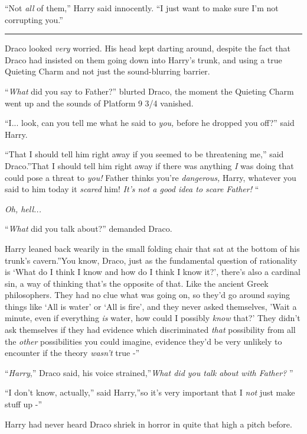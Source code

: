 ``Not \emph{all} of them,'' Harry said innocently. ``I just want to make
sure I'm not corrupting you.''

\begin{center}\rule{3in}{0.4pt}\end{center}

Draco looked \emph{very} worried. His head kept darting around, despite
the fact that Draco had insisted on them going down into Harry's trunk,
and using a true Quieting Charm and not just the sound-blurring barrier.

``\emph{What} did you say to Father?'' blurted Draco, the moment the
Quieting Charm went up and the sounds of Platform 9 3/4 vanished.

``I... look, can you tell me what he said to \emph{you,} before he
dropped you off?'' said Harry.

``That I should tell him right away if you seemed to be threatening
me,'' said Draco.''That I should tell him right away if there was
anything \emph{I} was doing that could pose a threat to \emph{you!}
Father thinks you're \emph{dangerous,} Harry, whatever you said to him
today it \emph{scared} him! \emph{It's not a good idea to scare Father!}
``

\emph{Oh, hell...}

``\emph{What} did you talk about?'' demanded Draco.

Harry leaned back wearily in the small folding chair that sat at the
bottom of his trunk's cavern.''You know, Draco, just as the fundamental
question of rationality is `What do I think I know and how do I think I
know it?', there's also a cardinal sin, a way of thinking that's the
opposite of that. Like the ancient Greek philosophers. They had no clue
what was going on, so they'd go around saying things like `All is water'
or `All is fire', and they never asked themselves, 'Wait a minute, even
if everything \emph{is} water, how could I possibly \emph{know} that?'
They didn't ask themselves if they had evidence which discriminated
\emph{that} possibility from all the \emph{other} possibilities you
could imagine, evidence they'd be very unlikely to encounter if the
theory \emph{wasn't} true -''

``\emph{Harry},'' Draco said, his voice strained,''\emph{What did you
talk about with Father?} ''

``I don't know, actually,'' said Harry,''so it's very important that I
\emph{not} just make stuff up -''

Harry had never heard Draco shriek in horror in quite that high a pitch
before.
